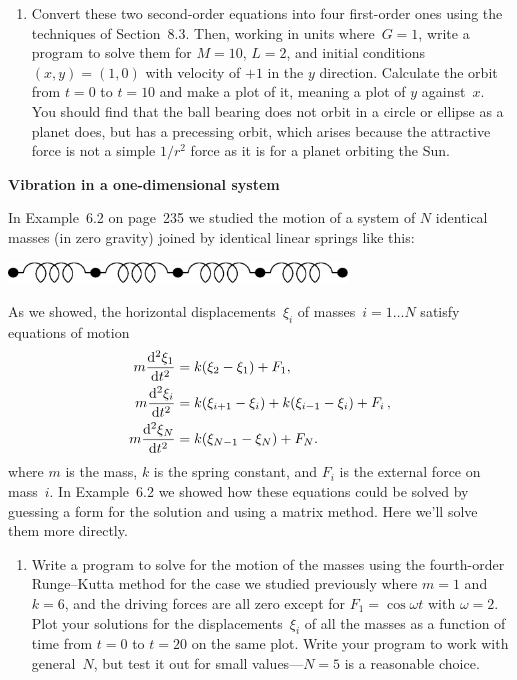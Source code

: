 \documentclass[12pt]{article}
\begin{document}
\begin{exercises}
\begin{enumerate}
\item Convert these two second-order equations into four first-order ones
  using the techniques of Section~8.3.  Then, working in units where~$G=1$,
  write a program to solve them for $M=10$, $L=2$, and initial conditions
  $(x,y)=(1,0)$ with velocity of $+1$ in the $y$ direction.  Calculate the
  orbit from $t=0$ to $t=10$ and make a plot of it, meaning a plot of $y$
  against~$x$.  You should find that the ball bearing does not orbit in a
  circle or ellipse as a planet does, but has a precessing orbit, which
  arises because the attractive force is not a simple $1/r^2$ force as it
  is for a planet orbiting the Sun.
\end{enumerate}



\exercise \textbf{Vibration in a one-dimensional system}

\exskip In Example~6.2 on page~235 we studied the motion of a system of $N$
identical masses (in zero gravity) joined by identical linear springs like
this: \medskip
\begin{center}
\includegraphics[width=9cm]{springs.eps}
\end{center}
As we showed, the horizontal displacements~$\xi_i$ of masses~$i=1\ldots N$
satisfy equations of motion
\begin{align*}
m {\mathrm{d}^2\xi_1\over\mathrm{d} t^2} &= k(\xi_2-\xi_1) + F_1,\\
m {\mathrm{d}^2\xi_i\over\mathrm{d} t^2} &= k(\xi_{i+1}-\xi_i) + k(\xi_{i-1}-\xi_i) + F_i\,,
  \\
m {\mathrm{d}^2\xi_N\over\mathrm{d} t^2} &= k(\xi_{N-1}-\xi_N) + F_N.
\end{align*}
where $m$ is the mass, $k$ is the spring constant, and $F_i$ is the
external force on mass~$i$.  In Example~6.2 we showed how these equations
could be solved by guessing a form for the solution and using a matrix
method.  Here we'll solve them more directly.
\begin{enumerate}\setlength{\itemsep}{0pt}
\item Write a program to solve for the motion of the masses using the
  fourth-order Runge--Kutta method for the case we studied previously where
  $m=1$ and $k=6$, and the driving forces are all zero except for $F_1 =
  \cos\omega t$ with $\omega=2$.  Plot your solutions for the
  displacements~$\xi_i$ of all the masses as a function of time from $t=0$
  to $t=20$ on the same plot.  Write your program to work with
  general~$N$, but test it out for small values---$N=5$ is a reasonable
  choice.


\end{enumerate}
\end{exercises}
\end{document}
